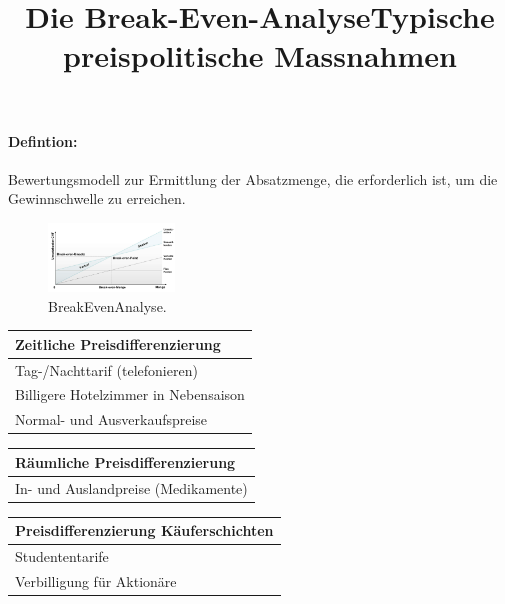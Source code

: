 \documentclass[../ZF_Wing.tex]{subfiles}
\begin{document}
\title{Die Break-Even-Analyse}

\paragraph{Defintion: } Bewertungsmodell zur Ermittlung der Absatzmenge, die erforderlich ist, um die Gewinnschwelle zu erreichen.

\begin{figure}[H]
\centering
\includegraphics[width=0.3\textwidth]{Resources/Image/Break-Even-Analyse.png}
\caption{\label{fig:BreakEvenAnalyse}BreakEvenAnalyse.}
\end{figure}


\title{\textbf{Typische preispolitische Massnahmen}}

\begin{table} [H]

\begin{tabular}{l}

\colorbox{pink!30}{\textbf{Zeitliche Preisdifferenzierung} }

\\\hline
Tag-/Nachttarif (telefonieren)\\
 Billigere Hotelzimmer in Nebensaison\\
 Normal- und Ausverkaufspreise\\
\end{tabular}
\end{table}


\begin{table} [H]

\begin{tabular}{l}

\colorbox{pink!30}{\textbf{Räumliche Preisdifferenzierung} }

\\\hline
In- und Auslandpreise (Medikamente)\\

\end{tabular}
\end{table}


\begin{table} [H]

\begin{tabular}{l}

\colorbox{pink!30}{\textbf{Preisdifferenzierung Käuferschichten} }

\\\hline
Studententarife\\
Verbilligung für Aktionäre\\
\end{tabular}
\end{table}
\end{document}
